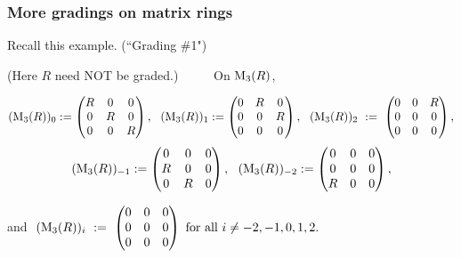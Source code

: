 \documentclass{beamer}
\begin{document}
\begin{frame}
\frametitle{More gradings on matrix rings}

Recall this example.   (``Grading $\#$1")  

  (Here $R$ need NOT be graded.)  
\ \ \ \ \ On $ {\rm M}_3(R)$, 

\scriptsize
$$ ( {\rm M}_3(R) )_0  :=   \begin{pmatrix}
R & 0 & 0 \\
0  & R & 0 \\
0 &  0 & R
\end{pmatrix},  \ \   ( {\rm M}_3(R) )_1  :=   \begin{pmatrix}
0 & R & 0 \\
0  & 0 & R \\
0 & 0 & 0 
\end{pmatrix}, \ \  ( {\rm M}_3(R) )_{2} \ := \   \begin{pmatrix}
0 & 0 & R \\
0   & 0 & 0 \\
0 & 0 & 0
\end{pmatrix}, $$
$$ ( {\rm M}_3(R) )_{-1}  :=   \begin{pmatrix}
0 & 0 & 0 \\
R  & 0 & 0 \\
0 &  R & 0
\end{pmatrix},  \ \   ( {\rm M}_3(R) )_{-2}  :=   \begin{pmatrix}
0 & 0 & 0 \\
0  & 0 & 0 \\
R & 0 & 0 
\end{pmatrix},$$

\bigskip

and $    \  ( {\rm M}_3(R) )_{i} \ := \   \begin{pmatrix}
0 & 0 & 0 \\
0   & 0 & 0 \\
0 & 0 & 0
\end{pmatrix} \mbox{ for all }  i \neq -2, -1, 0, 1, 2.$




\normalsize


\end{frame}
\end{document}
